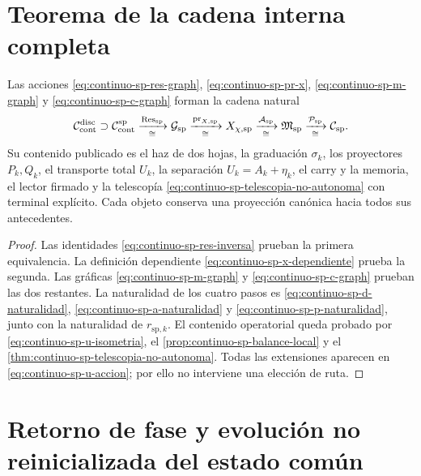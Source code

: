 \section{Teorema de la cadena interna completa}

\begin{theorem}
\label{thm:continuo-sp-cadena-interna}
Las acciones
\eqref{eq:continuo-sp-res-graph},
\eqref{eq:continuo-sp-pr-x},
\eqref{eq:continuo-sp-m-graph} y
\eqref{eq:continuo-sp-c-graph} forman la cadena natural
\begin{equation}
\label{eq:continuo-sp-cadena-interna}
 \mathcal C_{\rm cont}^{\rm disc}
 \supset\mathcal C_{\rm cont}^{\mathrm{sp}}
 \xrightarrow[\cong]{\operatorname{Res}_{\mathrm{sp}}}
 \mathcal G_{\mathrm{sp}}
 \xrightarrow[\cong]{\operatorname{pr}_{X,\mathrm{sp}}}
 X_{\chi,\mathrm{sp}}
 \xrightarrow[\cong]{\mathcal A_{\mathrm{sp}}}
 \mathfrak M_{\mathrm{sp}}
 \xrightarrow[\cong]{\mathcal P_{\mathrm{sp}}}
 \mathcal C_{\mathrm{sp}}.
\end{equation}
Su contenido publicado es el haz de dos hojas, la graduación
\(\sigma_k\), los proyectores \(P_k,Q_k\), el transporte total \(U_k\),
la separación \(U_k=A_k+\eta_k\), el carry y la memoria, el lector firmado
y la telescopía
\eqref{eq:continuo-sp-telescopia-no-autonoma} con terminal explícito. Cada
objeto conserva una proyección canónica hacia todos sus antecedentes.
\end{theorem}

\begin{proof}
Las identidades
\eqref{eq:continuo-sp-res-inversa} prueban la primera equivalencia. La
definición dependiente \eqref{eq:continuo-sp-x-dependiente} prueba la
segunda. Las gráficas
\eqref{eq:continuo-sp-m-graph} y
\eqref{eq:continuo-sp-c-graph} prueban las dos restantes. La naturalidad de
los cuatro pasos es
\eqref{eq:continuo-sp-d-naturalidad},
\eqref{eq:continuo-sp-a-naturalidad} y
\eqref{eq:continuo-sp-p-naturalidad}, junto con la naturalidad de
\(r_{\mathrm{sp},k}\). El contenido operatorial queda probado por
\eqref{eq:continuo-sp-u-isometria}, el
\cref{prop:continuo-sp-balance-local} y el
\cref{thm:continuo-sp-telescopia-no-autonoma}. Todas las extensiones aparecen
en \eqref{eq:continuo-sp-u-accion}; por ello no interviene una elección de
ruta.
\end{proof}

\fi
\section{Retorno de fase y evolución no reinicializada del estado común}

